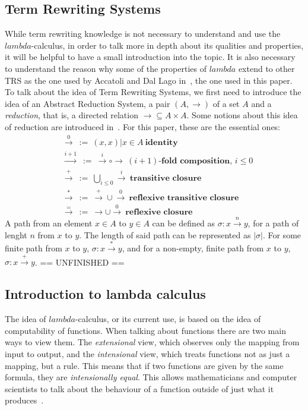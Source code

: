 \documentclass[12pt]{article}
\begin{document}
\subsection{Term Rewriting Systems}\label{intro-trs}
While term rewriting knowledge is not necessary to understand and use the $lambda$-calculus, in order to talk more in depth about its qualities and properties, it will be helpful to have a small introduction into the topic. It is also necessary to understand the reason why some of the properties of $lambda$ extend to other TRS as the one used by Accatoli and Dal Lago in~\cite{beta-invariance}, the one used in this paper.\\
To talk about the idea of Term Rewriting Systems, we first need to introduce the idea of an Abstract Reduction System, a pair $(A, \rightarrow)$ of a set $A$ and a \textit{reduction}, that is, a directed relation $\rightarrow \subseteq A \times A$. Some notions about this idea of reduction are introduced in~\cite{term-rewriting-and-all-that}. For this paper, these are the essential ones:
\begin{equation}
  \begin{split}
    &\xrightarrow{0} \ := \ {(x,x) | x \in A} \ \textbf{identity} \\
    &\xrightarrow{i + 1} \ := \ \xrightarrow{i} \circ \rightarrow \ (i+1)\textbf{-fold composition, } i \leq 0 \\
    &\xrightarrow{+} \ := \ \bigcup_{i \leq 0} \xrightarrow{i} \ \textbf{transitive closure} \\
    &\xrightarrow{*} \ := \ \xrightarrow{+} \cup \xrightarrow{0} \ \textbf{reflexive transitive closure} \\
    &\xrightarrow{=} \ := \ \rightarrow \cup \xrightarrow{0} \ \textbf{reflexive closure}
  \end{split}
\end{equation}
A path from an element $x \in A$ to $y \in A$ can be defined as $\sigma : x \xrightarrow{n} y$, for a path of lenght $n$ from $x$ to $y$. The length of said path can be represented as $| \sigma |$. For some finite path from $x$ to $y$, $\sigma : x \xrightarrow{*} y$, and for a non-empty, finite path from $x$ to $y$, $\sigma : x \xrightarrow{+} y$.
== UNFINISHED ==
\subsection{Introduction to lambda calculus}\label{intro-lambda}
The idea of $lambda$-calculus, or its current use, is based on the idea of computability of functions. When talking about functions there are two main ways to view them. The \textit{extensional} view, which observes only the mapping from input to output, and the \textit{intensional} view, which treats functions not as just a mapping, but a rule. This means that if two functions are given by the same formula, they are \textit{intensionally equal}. This allows mathematicians and computer scientists to talk about the behaviour of a function outside of just what it produces~\cite{selinger}.
\end{document}
